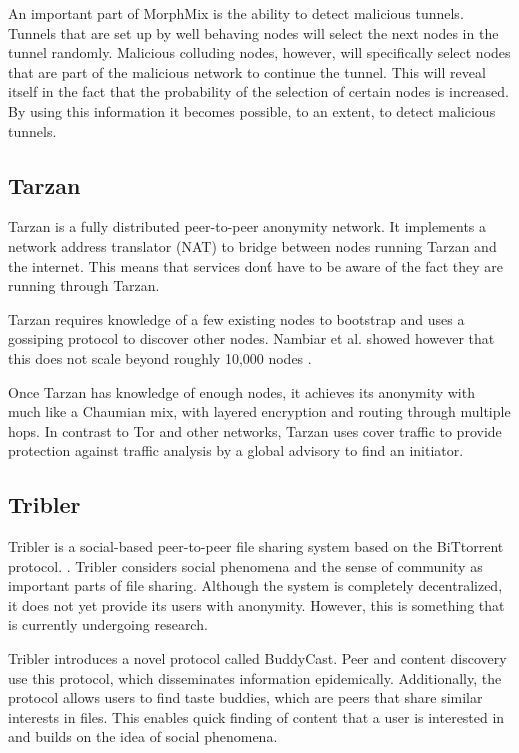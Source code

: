 \documentclass{article}
\begin{document}
		An important part of MorphMix is the ability to detect malicious tunnels. Tunnels that are set up by well behaving nodes will select the next nodes in the tunnel randomly. Malicious colluding nodes, however, will specifically select nodes that are part of the malicious network to continue the tunnel. This will reveal itself in the fact that the probability of the selection of certain nodes is increased. By using this information it becomes possible, to an extent, to detect malicious tunnels.
		
	\subsection{Tarzan} %
		Tarzan \cite{freedman2002tarzan} is a fully distributed peer-to-peer anonymity network. It implements a network address translator (NAT) to bridge between nodes running Tarzan and the internet. This means that services don\'t have to be aware of the fact they are running through Tarzan.
		
		Tarzan requires knowledge of a few existing nodes to bootstrap and uses a gossiping protocol to discover other nodes. Nambiar et al. showed however that this does not scale beyond roughly 10,000 nodes \cite{panchenko2009nisan, nambiar2006salsa}.
		
		Once Tarzan has knowledge of enough nodes, it achieves its anonymity with much like a Chaumian mix, with layered encryption and routing through multiple hops. In contrast to Tor and other networks, Tarzan uses cover traffic to provide protection against traffic analysis by a global advisory to find an initiator.
		
	\subsection{Tribler} %
		Tribler is a social-based peer-to-peer file sharing system based on the BiTtorrent protocol. \cite{pouwelse2008tribler}. Tribler considers social phenomena and the sense of community as important parts of file sharing. Although the system is completely decentralized, it does not yet provide its users with anonymity. However, this is something that is currently undergoing research.
		
		Tribler introduces a novel protocol called BuddyCast. Peer and content discovery use this protocol, which disseminates information epidemically. Additionally, the protocol allows users to find taste buddies, which are peers that share similar interests in files. This enables quick finding of content that a user is interested in and builds on the idea of social phenomena.
		
\end{document}
